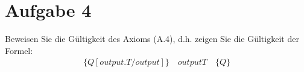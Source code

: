 \documentclass[ngerman,a4paper]{report}
\begin{document}
\section*{Aufgabe 4}
Beweisen Sie die Gültigkeit des Axioms (A.4), d.h. zeigen Sie die Gültigkeit der Formel:
\begin{align*}
\{Q[output.T/output]\}\quad
output T\quad
\{Q\}
\end{align*}

\end{document}
